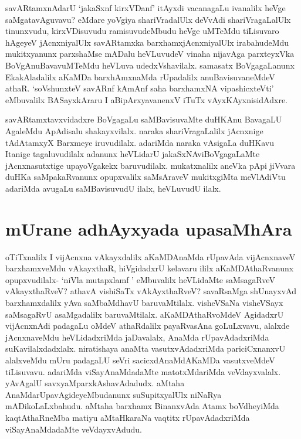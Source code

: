 \begin{artha}
savARtamxnAdarU `jakaSxnf kirxVDanf' itAyxdi vacanagaLu ivanalilx heVge saMgatavAguvavu? eMdare yoVgiya shariVradalUlx deVvAdi shariVragaLalUlx tinunxvudu, kirxVDisuvudu ramisuvudeMbudu heVge uMTeMdu tiLisuvaro hAgeyeV jAcnxniyalUlx savARtamxka barxhamxjAcnxniyalUlx irabahudeMdu mukitxyanunx parxshaMse mADalu heVLuvudeV vinaha nijavAga parxteyxVka BoVgAnuBavavuMTeMdu heVLuva udedxVshavilalx. samasatx BoVgagaLanunx EkakAladalilx aKaMDa barxhAmxnaMda rUpadalilx anuBavisuvaneMdeV athaR. `soV\s shunxteV savARnf kAmAnf saha barxhamxNA vipashicxteVti' eMbuvalilx BASayxkAraru I aBipArxyavanenxV iTuTx vAyxKAyxnisidAdxre.   
\end{artha}

\begin{artha}
savARtamxtavxvidadxre BoVgagaLu saMBavisuvaMte duHKAnu BavagaLU AgaleMdu ApAdisalu shakayxvilalx. naraka shariVragaLalilx jAcnxnige tAdAtamxyX Barxmeye iruvudilalx. adariMda naraka vAsigaLa duHKavu Itanige tagaluvudilalx adanunx heVLidarU jakaSxNAviBoVgagaLaMte jAcnxnasutxtige upayoVgakekx baruvudilalx. mukatxnalilx aneVka pApi jiVvara duHKa saMpakaRvanunx opupxvalilx saMsAraveV mukitxgiMta meVlAdiVtu adariMda avugaLu saMBavisuvudU ilalx, heVLuvudU ilalx.
\end{artha}

\section*{mUrane adhAyxyada upasaMhAra}%


\begin{artha}
oTiTxnalilx I vijAcnxna vAkayxdalilx aKaMDAnaMda rUpavAda vijAcnxnaveV barxhamxveMdu vAkayxthaR, hiVgidadxrU kelavaru ililx aKaMDAthaRvanunx opupxvudilalx- `niVla mutapxlamf ' eMbuvalilx heVLidaMte saMsagaRveV vAkayxthaRveV? athavA vishiSaTx vAkAyxthaRveV? savaRsaMga shUnayxvAd barxhamxdalilx yAva saMbaMdhavU baruvaMtilalx. visheVSaNa visheVSayx saMsagaRvU asaMgadalilx baruvaMtilalx. aKaMDAthaRvoMdeV AgidadxrU vijAcnxnAdi padagaLu oMdeV athaRdalilx payaRvasAna goLuLxvavu, alalxde jAcnxnaveMdu heVLidadxriMda jaDavalalx, AnaMda rUpavAdadxriMda suKavilalxdadxlalx. niratishaya anaMta vasutxvAdadxriMda pariciCxnanxvU alalxveMdu mUru padagaLU seVri sacicxdAnaMdAKaMDa vasutxveMdeV tiLisuvavu. adariMda viSayAnaMdadaMte matotxMdariMda veVdayxvalalx. yAvAgalU savxyaMparxkAshavAdadudx. aMtaha AnaMdarUpavAgideyeMbudanunx suSupitxyalUlx niNaRya mADikoLaLxbahudu. aMtaha barxhamx BinanxvAda Atamx boVdheyiMda kaqtAthaRneMba matiyu aMtaHkaraNa vaqtitx rUpavAdadxriMda viSayAnaMdadaMte veVdayxvAdudu.
\end{artha}

